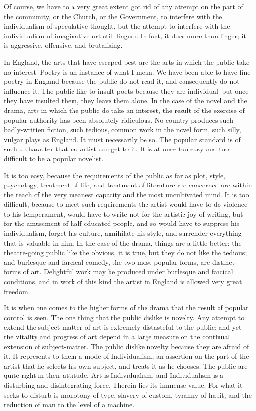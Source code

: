 Of course, we have to a very great extent got rid of any attempt on the part of the community, or the Church, or the Government, to interfere with the individualism of speculative thought, but the attempt to interfere with the individualism of imaginative art still lingers. In fact, it does more than linger; it is aggressive, offensive, and brutalising.\par

In England, the arts that have escaped best are the arts in which the public take no interest. Poetry is an instance of what I mean. We have been able to have fine poetry in England because the public do not read it, and consequently do not influence it. The public like to insult poets because they are individual, but once they have insulted them, they leave them alone. In the case of the novel and the drama, arts in which the public do take an interest, the result of the exercise of popular authority has been absolutely ridiculous. No country produces such badly-written fiction, such tedious, common work in the novel form, such silly, vulgar plays as England. It must necessarily be so. The popular standard is of such a character that no artist can get to it. It is at once too easy and too difficult to be a popular novelist.\par

It is too easy, because the requirements of the public as far as plot, style, psychology, treatment of life, and treatment of literature are concerned are within the reach of the very meanest capacity and the most uncultivated mind. It is too difficult, because to meet such requirements the artist would have to do violence to his temperament, would have to write not for the artistic joy of writing, but for the amusement of half-educated people, and so would have to suppress his individualism, forget his culture, annihilate his style, and surrender everything that is valuable in him. In the case of the drama, things are a little better: the theatre-going public like the obvious, it is true, but they do not like the tedious; and burlesque and farcical comedy, the two most popular forms, are distinct forms of art. Delightful work may be produced under burlesque and farcical conditions, and in work of this kind the artist in England is allowed very great freedom.\par

It is when one comes to the higher forms of the drama that the result of popular control is seen. The one thing that the public dislike is novelty. Any attempt to extend the subject-matter of art is extremely distasteful to the public; and yet the vitality and progress of art depend in a large measure on the continual extension of subject-matter. The public dislike novelty because they are afraid of it. It represents to them a mode of Individualism, an assertion on the part of the artist that he selects his own subject, and treats it as he chooses. The public are quite right in their attitude. Art is Individualism, and Individualism is a disturbing and disintegrating force. Therein lies its immense value. For what it seeks to disturb is monotony of type, slavery of custom, tyranny of habit, and the reduction of man to the level of a machine.\par

